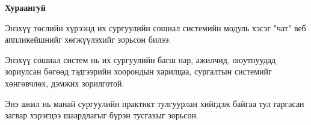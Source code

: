 

\begin{center}
{\scshape\Large \univname\par} %
{\scshape\large \facname\par}\vspace{0.5cm} %
{\huge\textbf{{Хураангуй}} \par}
\bigskip
{\Large{\ttitle} \par} %
\bigskip

{\normalsize \shortname \par} %
\addressname
\end{center}

\bigskip

Энэхүү төслийн хүрээнд их сургуулийн сошиал системийн модуль хэсэг "чат" веб аппликейшнийг хөгжүүлэхийг зорьсон билээ. 

Энэхүү сошиал систем нь их сургуулийн багш нар, ажилчид, оюутнуудад зориулсан бөгөөд тэдгээрийн хоорондын харилцаа, сургалтын системийг хөнгөвчлөх, дэмжих зорилготой.

Энэ ажил нь манай сургуулийн практикт тулгуурлан хийгдэж байгаа тул гаргасан загвар хэрэгцээ шаардлагыг бүрэн тусгахыг зорьсон.



